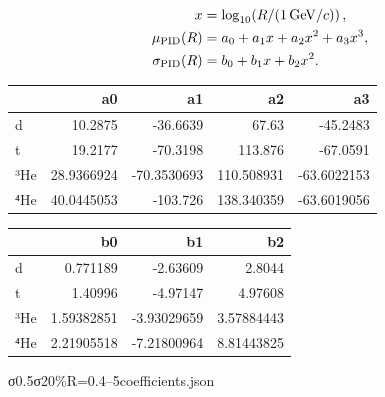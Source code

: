 \documentclass[10pt,a4paper]{article}
\begin{document}
\begin{align*}x&=\log_{10}\!\left(R/(1\,{\rm GeV}/c)\right),\\ \mu_{\rm PID}(R)&=a_0+a_1x+a_2x^2+a_3x^3,\\ \sigma_{\rm PID}(R)&=b_0+b_1x+b_2x^2.\end{align*}
\begin{center}\small\begin{tabular}{lrrrr}\toprule
\hspace{0pt}{\jpfont 核種}\hspace{0pt} & a0 & a1 & a2 & a3\\\midrule
{}d & 10.2875 & -36.6639 & 67.63 & -45.2483\\
{}t & 19.2177 & -70.3198 & 113.876 & -67.0591\\
{}³He & 28.9366924 & -70.3530693 & 110.508931 & -63.6022153\\
{}⁴He & 40.0445053 & -103.726 & 138.340359 & -63.6019056\\\bottomrule\end{tabular}\end{center}
\begin{center}\small\begin{tabular}{lrrr}\toprule
\hspace{0pt}{\jpfont 核種}\hspace{0pt} & b0 & b1 & b2\\\midrule
{}d & 0.771189 & -2.63609 & 2.8044\\
{}t & 1.40996 & -4.97147 & 4.97608\\
{}³He & 1.59382851 & -3.93029659 & 3.57884443\\
{}⁴He & 2.21905518 & -7.21800964 & 8.81443825\\\bottomrule\end{tabular}\end{center}
\hspace{0pt}{\jpfont 係数の調整では中心変化を元の}\hspace{0pt}σ\hspace{0pt}{\jpfont の}\hspace{0pt}0.5\hspace{0pt}{\jpfont 倍以内、幅変化を元の}\hspace{0pt}σ\hspace{0pt}{\jpfont の}\hspace{0pt}20\%\hspace{0pt}{\jpfont 以内とし、}\hspace{0pt}R=0.4–5\hspace{0pt}{\jpfont の監査域で中心と幅の正値を検証した。表は丸めた表示であり、再現には同梱}\hspace{0pt}coefficients.json\hspace{0pt}{\jpfont の全桁を用いる。}\hspace{0pt}
\end{document}
